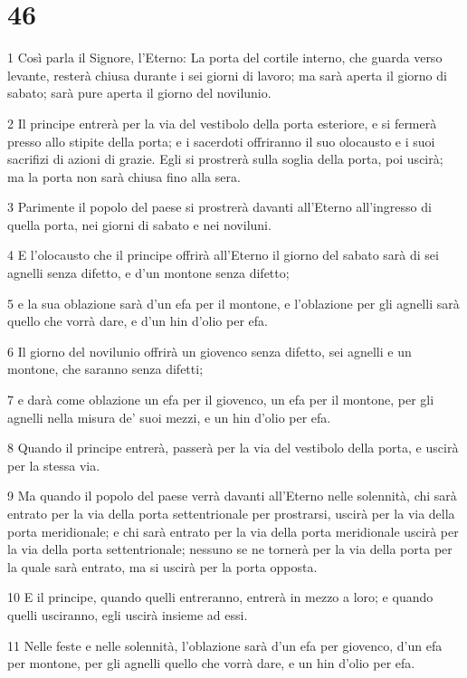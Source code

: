 \chapter{46}

\par 1 Così parla il Signore, l'Eterno: La porta del cortile interno, che guarda verso levante, resterà chiusa durante i sei giorni di lavoro; ma sarà aperta il giorno di sabato; sarà pure aperta il giorno del novilunio.
\par 2 Il principe entrerà per la via del vestibolo della porta esteriore, e si fermerà presso allo stipite della porta; e i sacerdoti offriranno il suo olocausto e i suoi sacrifizi di azioni di grazie. Egli si prostrerà sulla soglia della porta, poi uscirà; ma la porta non sarà chiusa fino alla sera.
\par 3 Parimente il popolo del paese si prostrerà davanti all'Eterno all'ingresso di quella porta, nei giorni di sabato e nei noviluni.
\par 4 E l'olocausto che il principe offrirà all'Eterno il giorno del sabato sarà di sei agnelli senza difetto, e d'un montone senza difetto;
\par 5 e la sua oblazione sarà d'un efa per il montone, e l'oblazione per gli agnelli sarà quello che vorrà dare, e d'un hin d'olio per efa.
\par 6 Il giorno del novilunio offrirà un giovenco senza difetto, sei agnelli e un montone, che saranno senza difetti;
\par 7 e darà come oblazione un efa per il giovenco, un efa per il montone, per gli agnelli nella misura de' suoi mezzi, e un hin d'olio per efa.
\par 8 Quando il principe entrerà, passerà per la via del vestibolo della porta, e uscirà per la stessa via.
\par 9 Ma quando il popolo del paese verrà davanti all'Eterno nelle solennità, chi sarà entrato per la via della porta settentrionale per prostrarsi, uscirà per la via della porta meridionale; e chi sarà entrato per la via della porta meridionale uscirà per la via della porta settentrionale; nessuno se ne tornerà per la via della porta per la quale sarà entrato, ma si uscirà per la porta opposta.
\par 10 E il principe, quando quelli entreranno, entrerà in mezzo a loro; e quando quelli usciranno, egli uscirà insieme ad essi.
\par 11 Nelle feste e nelle solennità, l'oblazione sarà d'un efa per giovenco, d'un efa per montone, per gli agnelli quello che vorrà dare, e un hin d'olio per efa.
